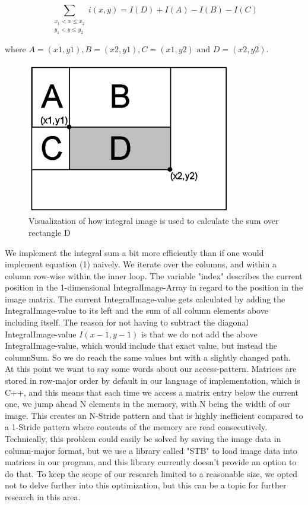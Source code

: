 \documentclass[sigconf]{acmart}
\begin{document}
\begin{equation}
{\sum _{\substack{x_{1}<x\leq x_{2}\\y_{1}<y\leq 
y_{2}}}i(x,y)} = I(D)+I(A)-I(B)-I(C) 
\end{equation}

where $A = (x1, y1), B = (x2, y1), C = (x1, y2) \text{ and } D = (x2, y2)$.\cite{IntImg}

\begin{figure}[htbp]
  \centering
  \includegraphics[width=0.7\linewidth]{./graphics/rectangle.png}
  \caption{Visualization of how integral image is used to calculate the sum over rectangle D} 
\end{figure}


We implement the integral sum a bit more efficiently than if one would implement equation (1) naively. We iterate over the columns, and within a column row-wise within the inner loop. The variable "index" describes the current position in the 1-dimensional IntegralImage-Array in regard to the position in the image matrix. The current IntegralImage-value gets calculated by adding the IntegralImage-value to its left and the sum of all column elements above including itself. The reason for not having to subtract the diagonal IntegralImage-value $I(x-1,y-1)$ is that we do not add the above IntegralImage-value, which would include that exact value, but instead the columnSum. So we do reach the same values but with a slightly changed path.\\
At this point we want to say some words about our access-pattern. Matrices are stored in row-major order by default in our language of implementation, which is C++, and this means that each time we access a matrix entry below the current one, we jump ahead N elements in the memory, with N being the width of our image. This creates an N-Stride pattern and that is highly inefficient compared to a 1-Stride pattern where contents of the memory are read consecutively. Technically, this problem could easily be solved by saving the image data in column-major format, but we use a library called "STB"\cite{std} to load image data into matrices in our program, and this library currently doesn't provide an option to do that. To keep the scope of our research limited to a reasonable size, we opted not to delve further into this optimization, but this can be a topic for further research in this area. \\
\end{document}
